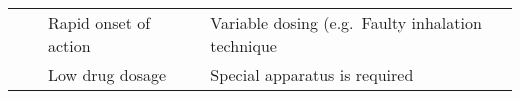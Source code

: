 \begin{table*}[!htbp]
\begin{tabular}{@{}lllll@{}}
		&  & Rapid onset of action   &           &  Variable dosing (e.g.\ Faulty inhalation technique                                                                                                                        \\
		&  & Low drug dosage       &          &   Special apparatus is required                                                                                                                \\ \bottomrule[1pt]
	\end{tabular}
\end{table*}



